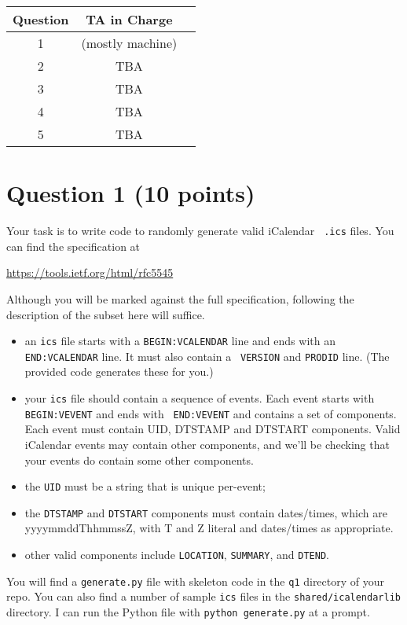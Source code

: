 \documentclass[10pt,hidelinks]{article}
\begin{document}
 \begin{center}
 \begin{tabular}{c|cc}
 Question   &  TA in Charge \\ \hline
1 & (mostly machine) \\ 
2 & TBA \\ 
3 & TBA \\ 
4 & TBA \\
5 & TBA
 \end{tabular}
 \end{center}

 \newpage
\section*{Question 1 (10 points)}

Your task is to write code to randomly generate valid iCalendar {\tt
  .ics} files. You can find the specification at

\begin{center}
  \url{https://tools.ietf.org/html/rfc5545}
\end{center}
Although you will be marked against the full specification, following
the description of the subset here will suffice.

\begin{itemize}
  \item an {\tt ics} file starts with a {\tt BEGIN:VCALENDAR} line and
    ends with an {\tt END:VCALENDAR} line. It must also contain a {\tt
      VERSION} and {\tt PRODID} line. (The provided code generates
    these for you.)
  \item your {\tt ics} file should contain a sequence of events.  Each
    event starts with {\tt BEGIN:VEVENT} and ends with {\tt
      END:VEVENT} and contains a set of components.  Each event must
    contain UID, DTSTAMP and DTSTART components. Valid iCalendar
    events may contain other components, and we'll be checking that
    your events do contain some other components.
  \item the {\tt UID} must be a string that is unique per-event;
  \item the {\tt DTSTAMP} and {\tt DTSTART} components must contain dates/times, which are
    yyyymmddThhmmssZ, with T and Z literal and dates/times as appropriate.
  \item other valid components include {\tt LOCATION}, {\tt SUMMARY}, and {\tt DTEND}.
\end{itemize}

You will find a {\tt generate.py} file with skeleton code in the {\tt q1} directory of your repo.
You can also find a number of sample {\tt ics} files in the {\tt shared/icalendarlib} directory.
I can run the Python file with {\tt python generate.py} at a prompt.
\end{document}
